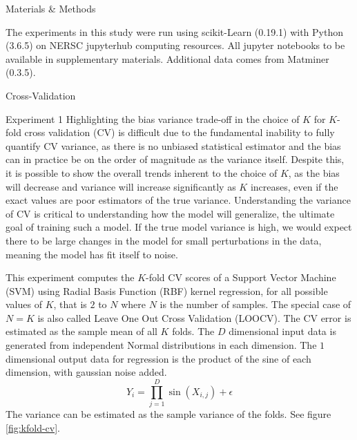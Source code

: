 \documentclass[onecolumn,abstract,letter]{scrartcl}
\begin{document}

\begin{section}{Materials \& Methods}

The experiments in this study were run using scikit-Learn (0.19.1) with Python (3.6.5) on NERSC jupyterhub computing resources. All jupyter notebooks to be available in supplementary materials. 
Additional data comes from Matminer (0.3.5).

\begin{subsection}{Cross-Validation}

\begin{subsubsection}{Experiment 1}
Highlighting the bias variance trade-off in the choice of $K$ for $K$-fold cross validation (CV) is difficult due to the fundamental inability to fully quantify CV variance, as there is no unbiased statistical estimator and the bias can in practice be on the order of magnitude as the variance itself.
Despite this, it is possible to show the overall trends inherent to the choice of $K$, as the bias will decrease and variance will increase significantly as $K$ increases, even if the exact values are poor estimators of the true variance. 
Understanding the variance of CV is critical to understanding how the model will generalize, the ultimate goal of training such a model.
If the true model variance is high, we would expect there to be large changes in the model for small perturbations in the data, meaning the model has fit itself to noise.

This experiment computes the $K$-fold CV scores of a Support Vector Machine (SVM) using Radial Basis Function (RBF) kernel regression, for all possible values of $K$, that is $2$ to $N$ where $N$ is the number of samples.
The special case of $N=K$ is also called Leave One Out Cross Validation (LOOCV).
The CV error is estimated as the sample mean of all $K$ folds.
The $D$ dimensional input data is generated from independent Normal distributions in each dimension.
The $1$ dimensional output data for regression is the product of the sine of each dimension, with gaussian noise added.
\begin{equation}
    Y_i = \prod_{j=1}^{D} \sin(X_{i,j}) + \epsilon
\end{equation}
The variance can be estimated as the sample variance of the folds. See figure \ref{fig:kfold-cv}.
\end{subsubsection}


\end{subsection}
\end{section}
\end{document}
